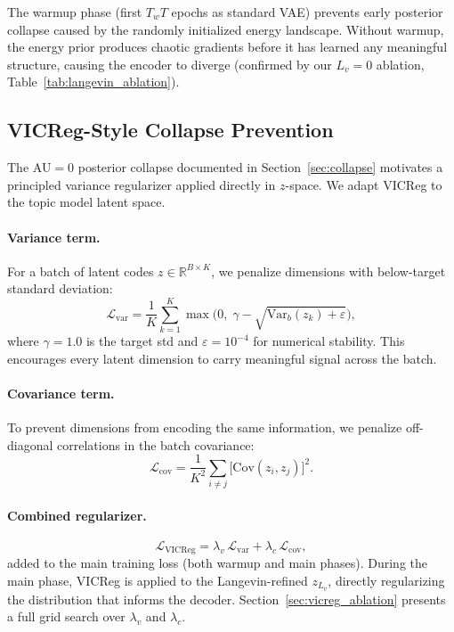 \documentclass[10pt]{article}
\begin{document}
The warmup phase (first $T_w T$ epochs as standard VAE) prevents early posterior
collapse caused by the randomly initialized energy landscape.
Without warmup, the energy prior produces chaotic gradients before it has learned
any meaningful structure, causing the encoder to diverge (confirmed by our $L_v{=}0$
ablation, Table~\ref{tab:langevin_ablation}).

\subsection{VICReg-Style Collapse Prevention}
\label{sec:vicreg}

The AU$=0$ posterior collapse documented in Section~\ref{sec:collapse}
motivates a principled variance regularizer applied directly in $z$-space.
We adapt VICReg \citep{bardes2022vicreg} to the topic model latent space.

\paragraph{Variance term.}
For a batch of latent codes $z \in \mathbb{R}^{B \times K}$, we penalize
dimensions with below-target standard deviation:
\begin{equation}
    \mathcal{L}_\mathrm{var}
    = \frac{1}{K}\sum_{k=1}^{K}
      \max\!\bigl(0,\;\gamma - \sqrt{\mathrm{Var}_b(z_k) + \varepsilon}\bigr),
    \label{eq:vicreg_var}
\end{equation}
where $\gamma = 1.0$ is the target std and $\varepsilon = 10^{-4}$ for numerical stability.
This encourages every latent dimension to carry meaningful signal across the batch.

\paragraph{Covariance term.}
To prevent dimensions from encoding the same information, we penalize off-diagonal
correlations in the batch covariance:
\begin{equation}
    \mathcal{L}_\mathrm{cov}
    = \frac{1}{K^2}
      \sum_{i \neq j} \bigl[\mathrm{Cov}(z_i, z_j)\bigr]^2.
    \label{eq:vicreg_cov}
\end{equation}

\paragraph{Combined regularizer.}
\begin{equation}
    \mathcal{L}_\mathrm{VICReg}
    = \lambda_v \,\mathcal{L}_\mathrm{var}
    + \lambda_c \,\mathcal{L}_\mathrm{cov},
    \label{eq:vicreg}
\end{equation}
added to the main training loss (both warmup and main phases).
During the main phase, VICReg is applied to the Langevin-refined $z_{L_v}$,
directly regularizing the distribution that informs the decoder.
Section~\ref{sec:vicreg_ablation} presents a full grid search over $\lambda_v$ and $\lambda_c$.
\end{document}
